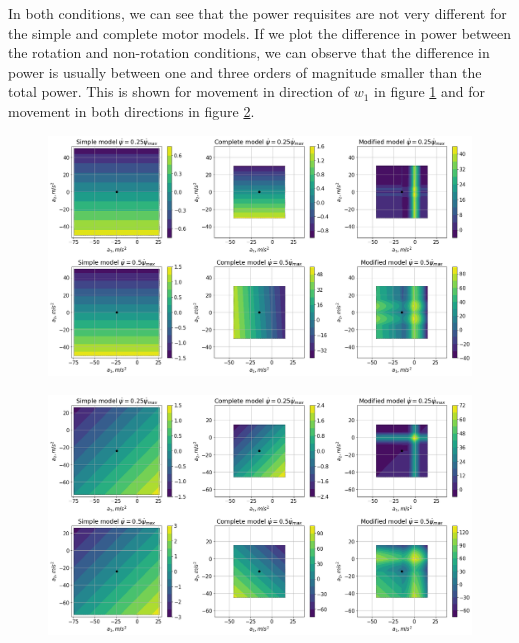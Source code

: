 \documentclass[12pt]{article}
\begin{document}
In both conditions, we can see that the power requisites are not very different for the simple and complete motor models. If we plot the difference in power between the rotation and non-rotation conditions, we can observe that the difference in power is usually between one and three orders of magnitude smaller than the total power. This is shown for movement in direction of $w_1$ in figure \ref{fig:psidot_comp_w1_diff} and for movement in both directions in figure \ref{fig:psidot_comp_w1_w2_diff}.
\begin{figure}[h]
	\centering
	\includegraphics[width=1\linewidth]{psidot_comp_w1_diff}
	\label{fig:psidot_comp_w1_diff}
\end{figure}
\begin{figure}[h]
	\centering
	\includegraphics[width=1\linewidth]{psidot_comp_w1_w2_diff}
	\label{fig:psidot_comp_w1_w2_diff}
\end{figure}
\end{document}

